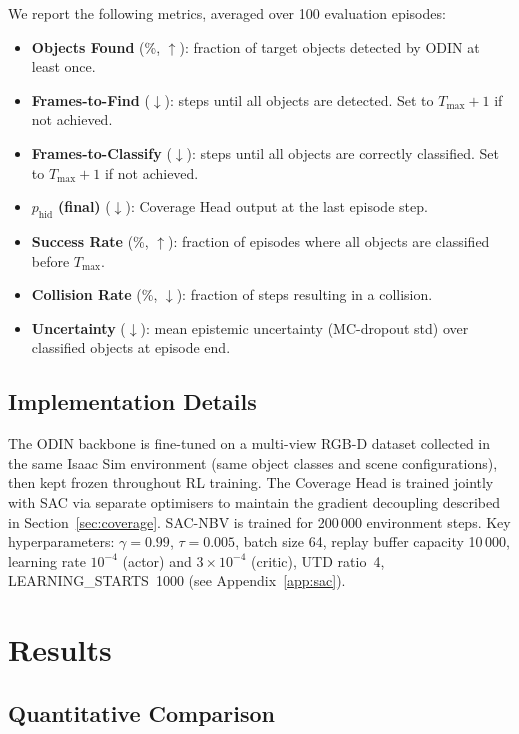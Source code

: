 \documentclass{article}
\newcommand{\phid}{p_{\text{hid}}}
\begin{document}
We report the following metrics, averaged over 100 evaluation episodes:
\begin{itemize}
  \item \textbf{Objects Found} (\%, $\uparrow$): fraction of target objects detected by ODIN at least once.
  \item \textbf{Frames-to-Find} ($\downarrow$): steps until all objects are detected. Set to $T_{\max}+1$ if not achieved.
  \item \textbf{Frames-to-Classify} ($\downarrow$): steps until all objects are correctly classified. Set to $T_{\max}+1$ if not achieved.
  \item $\phid$ \textbf{(final)} ($\downarrow$): Coverage Head output at the last episode step.
  \item \textbf{Success Rate} (\%, $\uparrow$): fraction of episodes where all objects are classified before $T_{\max}$.
  \item \textbf{Collision Rate} (\%, $\downarrow$): fraction of steps resulting in a collision.
  \item \textbf{Uncertainty} ($\downarrow$): mean epistemic uncertainty (MC-dropout std) over classified objects at episode end.
\end{itemize}

\subsection{Implementation Details}

The ODIN backbone is fine-tuned on a multi-view RGB-D dataset collected in the same Isaac Sim environment (same object classes and scene configurations), then kept frozen throughout RL training. The Coverage Head is trained jointly with SAC via separate optimisers to maintain the gradient decoupling described in Section~\ref{sec:coverage}. SAC-NBV is trained for 200\,000 environment steps. Key hyperparameters: $\gamma = 0.99$, $\tau = 0.005$, batch size 64, replay buffer capacity 10\,000, learning rate $10^{-4}$ (actor) and $3\times10^{-4}$ (critic), UTD ratio~4, LEARNING\_STARTS~1000 (see Appendix~\ref{app:sac}).

\FloatBarrier
\section{Results}
\label{sec:results}

\subsection{Quantitative Comparison}
\end{document}
